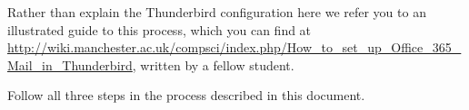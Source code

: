 Rather than explain the Thunderbird configuration here we refer you to an illustrated guide to this process, which you can find at \url{http://wiki.manchester.ac.uk/compsci/index.php/How_to_set_up_Office_365_Mail_in_Thunderbird}, written by a fellow student.

Follow all three steps in the process described in this document.



